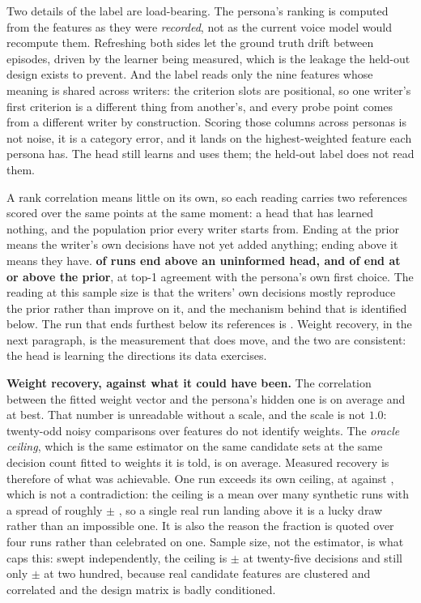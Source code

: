 \documentclass{article}
\begin{document}
Two details of the label are load-bearing. The persona's ranking is computed from the features as they were
\emph{recorded}, not as the current voice model would recompute them.
Refreshing both sides let the ground truth drift between episodes, driven by the learner
being measured, which is the leakage the held-out design exists to prevent. And the label reads only the nine
features whose meaning is shared across writers: the criterion slots are positional, so one
writer's first criterion is a different thing from another's, and every probe point comes
from a different writer by construction. Scoring those columns across personas is not noise,
it is a category error, and it lands on the highest-weighted feature each persona has. The
head still learns and uses them; the held-out label does not read them.

A rank correlation means little on its own, so each reading carries two references scored
over the same points at the same moment: a head that has learned nothing, and the population
prior every writer starts from. Ending at the prior means the writer's own decisions have
not yet added anything; ending above it means they have.
\textbf{\rProbeAboveUniform{} of \rLiveRunCount{} runs end above an uninformed head, and
\rProbeAtOrAbovePrior{} of \rLiveRunCount{} end at or above the prior}, at
\rProbeTopOneLast{} top-1 agreement with the persona's own first choice. The reading at this
sample size is that the writers' own decisions mostly reproduce the prior rather than improve
on it, and the mechanism behind that is identified below. The run that ends furthest below
its references is \rProbeWorstPersona{}. Weight recovery, in the next paragraph, is the measurement that does move,
and the two are consistent: the head is learning the directions its data exercises.

\textbf{Weight recovery, against what it could have been.} The correlation between the
fitted weight vector and the persona's hidden one is \rLiveWeightRecoveryMean{} on average
and \rLiveWeightRecoveryBest{} at best. That number is unreadable without a scale, and the
scale is not $1.0$: twenty-odd noisy comparisons over \rFeatures{} features do not identify
\rFeatures{} weights. The \emph{oracle ceiling}, which is the same estimator on
the same candidate sets at the same decision count fitted to weights it is told, is
\rCeilingMean{} on average. Measured recovery is therefore \rRecoveryFractionOfCeiling{} of
what was achievable. One run exceeds its own ceiling, at
\rLiveWeightRecoveryBest{} against \rCeilingBest{}, which is not a contradiction: the
ceiling is a mean over many synthetic runs with a spread of roughly $\pm$
\rCeilingAtTwoHundredSd{}, so a single real run landing above it is a lucky draw rather than
an impossible one. It is also the reason the fraction is quoted over four runs rather than
celebrated on one. Sample size, not the estimator, is what caps this: swept independently,
the ceiling is \rCeilingAtTwentyFive{} $\pm$ \rCeilingAtTwentyFiveSd{} at twenty-five
decisions and still only \rCeilingAtTwoHundred{} $\pm$ \rCeilingAtTwoHundredSd{} at two
hundred, because real candidate features are clustered and correlated and the design matrix
is badly conditioned.
\end{document}
